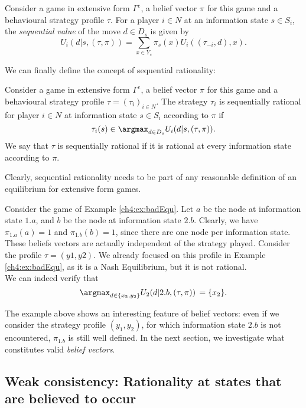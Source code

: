 \begin{definition}
Consider a game in extensive form $\Gamma^e$, a belief vector $\pi$ for this game and a behavioural strategy profile $\tau$.
For a player $i \in N$ at an information state $s \in S_i$, the \emph{sequential value} of the move $d \in D_s$ is given by
$$ U_i(d| s, (\tau, \pi) ) = \sum_{x \in Y_s} \pi_s(x) U_i((\tau_{-i}, d), x). $$ 
\end{definition}

We can finally define the concept of sequential rationality:
\begin{definition}
Consider a game in extensive form $\Gamma^e$, a belief vector $\pi$ for this game and a behavioural strategy profile $\tau = (\tau_i)_{i \in N}$. The strategy $\tau_i$ is sequentially rational for player $i \in N$ at information state $s \in S_i$ according to $\pi$ if 
$$\tau_i(s) \in \argmax_{d \in D_s}  U_i(d| s, ( \tau, \pi) ).$$
We say that $\tau$ is sequentially rational if it is rational at every information state according to $\pi$.
\end{definition}

Clearly, sequential rationality needs to be part of any reasonable definition of an equilibrium for extensive form games.
\begin{example}
\label{ch4:ex:seqRatio}
Consider the game of Example \ref{ch4:ex:badEqu}. Let $a$ be the node at information state $1.a$, and $b$ be the node at information state $2.b$. 
Clearly, we have $\pi_{1.a}(a) = 1$ and $\pi_{1.b}(b) = 1$, since there are one node per information state. These beliefs vectors are actually independent of the strategy played. 
Consider the profile $\tau = (y1, y2)$. We already focused on this profile in Example \ref{ch4:ex:badEqu}, as it is a Nash Equilibrium, but it is not rational. \\
We can indeed verify that 
$$ \argmax_{d \in \{x_2, y_2\}} U_2(d | 2.b, (\tau, \pi)) \, = \{x_2\}. $$
\end{example}

The example above shows an interesting feature of belief vectors: even if we consider the strategy profile $(y_1, y_2)$, for which information state $2.b$ is not encountered, $\pi_{1.b}$ is still well defined. In the next section, we investigate what constitutes valid \emph{belief vectors}. 
\subsection{Weak consistency: Rationality at states that are believed to occur}


